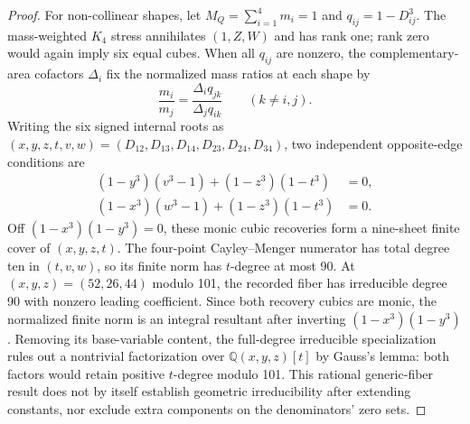 \documentclass[11pt]{amsart}
\theoremstyle{remark}
\begin{document}
\begin{proof}
For non-collinear shapes, let $M_Q=\sum_{i=1}^4m_i=1$ and $q_{ij}=1-D_{ij}^3$. The mass-weighted $K_4$ stress annihilates $(1,Z,W)$ and has rank one; rank zero would again imply six equal cubes. When all $q_{ij}$ are nonzero, the complementary-area cofactors $\Delta_i$ fix the normalized mass ratios at each shape by
\begin{equation}\label{eq:no88-mass-ratios}
\frac{m_i}{m_j}=\frac{\Delta_iq_{jk}}{\Delta_jq_{ik}}
\qquad(k\ne i,j).
\end{equation}
Writing the six signed internal roots as $(x,y,z,t,v,w)=(D_{12},D_{13},D_{14},D_{23},D_{24},D_{34})$, two independent opposite-edge conditions are
\begin{align}
(1-y^3)(v^3-1)+(1-z^3)(1-t^3)&=0,\label{eq:no88-opposite-y}\\
(1-x^3)(w^3-1)+(1-z^3)(1-t^3)&=0.\label{eq:no88-opposite-x}
\end{align}
Off $(1-x^3)(1-y^3)=0$, these monic cubic recoveries form a nine-sheet finite cover of $(x,y,z,t)$. The four-point Cayley--Menger numerator has total degree ten in $(t,v,w)$, so its finite norm has $t$-degree at most 90. At $(x,y,z)=(52,26,44)$ modulo 101, the recorded fiber has irreducible degree 90 with nonzero leading coefficient. Since both recovery cubics are monic, the normalized finite norm is an integral resultant after inverting $(1-x^3)(1-y^3)$. Removing its base-variable content, the full-degree irreducible specialization rules out a nontrivial factorization over $\mathbb Q(x,y,z)[t]$ by Gauss's lemma: both factors would retain positive $t$-degree modulo 101. This rational generic-fiber result does not by itself establish geometric irreducibility after extending constants, nor exclude extra components on the denominators' zero sets.


\end{proof}
\end{document}
